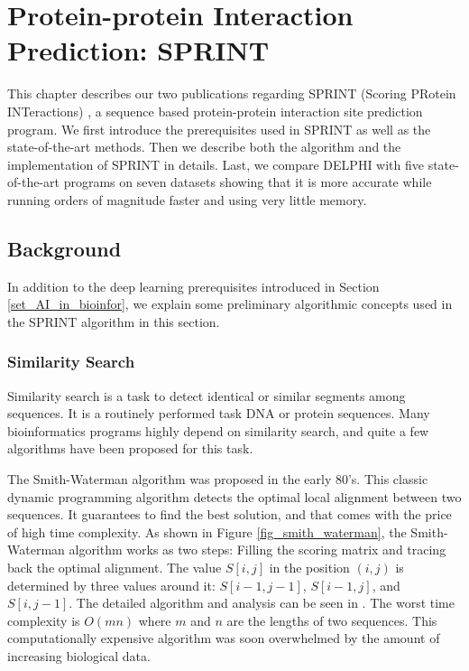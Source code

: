 \chapter{Protein-protein Interaction Prediction: SPRINT \label{chap_3}}
This chapter describes our two publications regarding SPRINT (Scoring PRotein INTeractions) \cite{li2017sprint, li2020predicting}, a sequence based protein-protein interaction site prediction program. We first introduce the prerequisites used in SPRINT as well as the state-of-the-art methods. Then we describe both the algorithm and the implementation of SPRINT in details.  Last, we compare DELPHI with five state-of-the-art programs on seven datasets showing that it is more accurate while running orders of magnitude faster and using very little memory.
\section{Background}
In addition to the deep learning prerequisites introduced in Section \ref{set_AI_in_bioinfor}, we explain some preliminary algorithmic concepts used in the SPRINT algorithm in this section.
\subsection{Similarity Search}
Similarity search is a task to detect identical or similar segments among sequences. It is a routinely performed task DNA or protein sequences. Many bioinformatics programs highly depend on similarity search, and quite a few algorithms have been proposed for this task. 

The Smith-Waterman algorithm \cite{smith_waterman_1981} was proposed in the early 80's. This classic dynamic programming algorithm detects the optimal local alignment between two sequences. It guarantees to find the best solution, and that comes with the price of high time complexity. As shown in Figure \ref{fig_smith_waterman}, the Smith-Waterman algorithm works as two steps: Filling the scoring matrix and tracing back the optimal alignment. The value $S[i,j]$ in the position  $(i,j)$ is determined by three values around it: $S[i-1,j-1]$, $S[i-1,j]$, and $S[i,j-1]$. The detailed algorithm and analysis can be seen in \cite{smith_waterman_1981}. The worst time complexity is $O(mn)$ where $m$ and $n$ are the lengths of two sequences. This computationally expensive algorithm was soon overwhelmed by the amount of increasing biological data.


